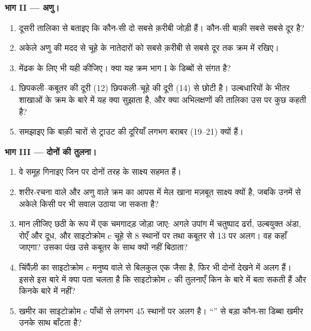 \begin{problem}
\medskip
\noindent\textbf{भाग II --- अणु।}
\begin{enumerate}[resume]
  \item दूसरी तालिका से बताइए कि कौन-सी दो  सबसे क़रीबी जोड़ी
        हैं। कौन-सी  बाक़ी सबसे सबसे दूर है?
  \item अकेले अणु की मदद से चूहे के नातेदारों को सबसे क़रीबी से सबसे दूर
        तक क्रम में रखिए।
  \item मेंढक के लिए भी यही कीजिए। क्या यह क्रम भाग I के डिब्बों से
        संगत है?
  \item छिपकली--कबूतर की दूरी (12) छिपकली--चूहे की दूरी (14) से छोटी
        है। उल्बधारियों के भीतर शाखाओं के क्रम के बारे में यह क्या
        सुझाता है, और क्या अभिलक्षणों की तालिका उस पर कुछ कहती है?
  \item समझाइए कि बाक़ी चारों से ट्राउट की दूरियाँ लगभग बराबर (19--21)
        क्यों हैं।
\end{enumerate}

\medskip
\noindent\textbf{भाग III --- दोनों की तुलना।}
\begin{enumerate}[resume]
  \item वे समूह गिनाइए जिन पर दोनों तरह के साक्ष्य सहमत हैं।
  \item शरीर-रचना वाले और अणु वाले क्रम का आपस में मेल खाना मज़बूत
        साक्ष्य क्यों है, जबकि उनमें से अकेले किसी पर भी सवाल उठाया जा
        सकता है?
  \item मान लीजिए छठी  के रूप में एक चमगादड़ जोड़ा जाए: अगले
        उपांग में चतुष्पाद ढर्रा, उल्बयुक्त अंडा, रोएँ और दूध, और
        साइटोक्रोम c चूहे से 8 स्थानों पर तथा कबूतर से 13 पर अलग। वह
        कहाँ जाएगा? उसका पंख उसे कबूतर के साथ क्यों नहीं बिठाता?
  \item चिंपैंज़ी का साइटोक्रोम c मनुष्य वाले से बिलकुल एक जैसा है, फिर
        भी दोनों  देखने में अलग हैं। इससे इस बारे में क्या पता
        चलता है कि साइटोक्रोम c की तुलनाएँ किन  के बारे में बता
        सकती हैं और किनके बारे में नहीं?
  \item खमीर का साइटोक्रोम c पाँचों से लगभग 45 स्थानों पर अलग है।
        ``'' से बड़ा कौन-सा डिब्बा खमीर उनके साथ बाँटता है?
\end{enumerate}


\end{problem}
